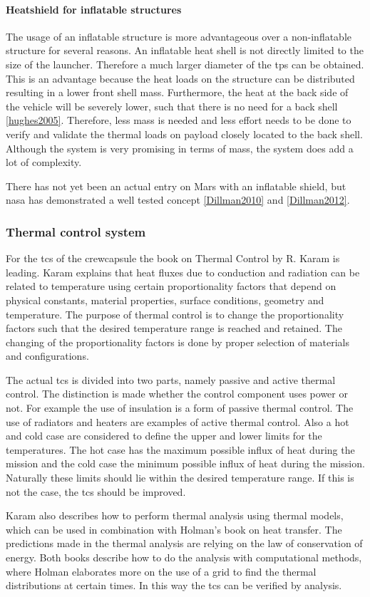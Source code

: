 \paragraph{Heatshield for inflatable structures}
The usage of  an inflatable structure is more advantageous over a non-inflatable structure for several reasons. An inflatable heat shell is not directly limited to the size of the launcher. Therefore a much larger diameter of the \gls{tps} can be obtained. This is an advantage because the heat loads on the structure can be distributed resulting in a lower front shell mass. Furthermore, the heat at the back side of the vehicle will be severely lower, such that there is no need for a back shell \ref{hughes2005}. Therefore, less mass is needed and less effort needs to be done to verify and validate the thermal loads on payload closely located to the back shell. Although the system is very promising in terms of mass, the system does add a lot of complexity.

There has not yet been an actual entry on Mars with an inflatable shield, but \gls{nasa} has demonstrated a well tested concept \ref{Dillman2010} and \ref{Dillman2012}.

\subsubsection{Thermal control system}
For the \gls{tcs} of the crewcapsule the book on Thermal Control by R. Karam is leading. \cite{Karam1998} Karam explains that heat fluxes due to conduction and radiation can be related to temperature using certain proportionality factors that depend on physical constants, material properties, surface conditions, geometry and temperature. The purpose of thermal control is to change the proportionality factors such that the desired temperature range is reached and retained. The changing of the proportionality factors is done by proper selection of materials and configurations.

The actual \gls{tcs} is divided into two parts, namely passive and active thermal control. The distinction is made whether the control component uses power or not. For example the use of insulation is a form of passive thermal control. The use of radiators and heaters are examples of active thermal control. Also a hot and cold case are considered to define the upper and lower limits for the temperatures. The hot case has the maximum possible influx of heat during the mission and the cold case the minimum possible influx of heat during the mission. Naturally these limits should lie within the desired temperature range. If this is not the case, the \gls{tcs} should be improved.

Karam also describes how to perform thermal analysis using thermal models, which can be used in combination with Holman's book on heat transfer. \cite{Holman2002} The predictions made in the thermal analysis are relying on the law of conservation of energy. Both books describe how to do the analysis with computational methods, where Holman elaborates more on the use of a grid to find the thermal distributions at certain times. In this way the \gls{tcs} can be verified by analysis.




